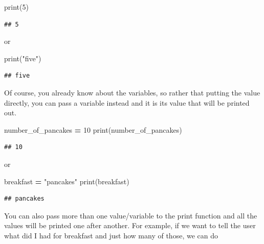 \documentclass[
]{book}
\newenvironment{Shaded}{\begin{snugshade}}{\end{snugshade}}
\newcommand{\BuiltInTok}[1]{#1}
\newcommand{\DecValTok}[1]{\textcolor[rgb]{0.00,0.00,0.81}{#1}}
\newcommand{\NormalTok}[1]{#1}
\newcommand{\OperatorTok}[1]{\textcolor[rgb]{0.81,0.36,0.00}{\textbf{#1}}}
\newcommand{\StringTok}[1]{\textcolor[rgb]{0.31,0.60,0.02}{#1}}
\begin{document}
\begin{Shaded}
\begin{Highlighting}[]
\BuiltInTok{print}\NormalTok{(}\DecValTok{5}\NormalTok{)}
\end{Highlighting}
\end{Shaded}

\begin{verbatim}
## 5
\end{verbatim}

or

\begin{Shaded}
\begin{Highlighting}[]
\BuiltInTok{print}\NormalTok{(}\StringTok{"five"}\NormalTok{)}
\end{Highlighting}
\end{Shaded}

\begin{verbatim}
## five
\end{verbatim}

Of course, you already know about the variables, so rather that putting the value directly, you can pass a variable instead and it is its value that will be printed out.

\begin{Shaded}
\begin{Highlighting}[]
\NormalTok{number\_of\_pancakes }\OperatorTok{=} \DecValTok{10}
\BuiltInTok{print}\NormalTok{(number\_of\_pancakes)}
\end{Highlighting}
\end{Shaded}

\begin{verbatim}
## 10
\end{verbatim}

or

\begin{Shaded}
\begin{Highlighting}[]
\NormalTok{breakfast }\OperatorTok{=} \StringTok{"pancakes"}
\BuiltInTok{print}\NormalTok{(breakfast)}
\end{Highlighting}
\end{Shaded}

\begin{verbatim}
## pancakes
\end{verbatim}

You can also pass more than one value/variable to the print function and all the values will be printed one after another. For example, if we want to tell the user what did I had for breakfast and just how many of those, we can do
\end{document}
